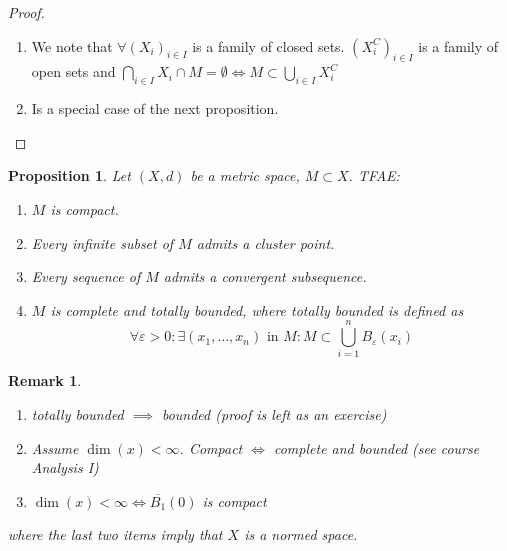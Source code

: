\documentclass[a4paper]{article}
\newcounter{lecref}[section]
\numberwithin{lecref}{section}
\newtheorem*{Remark}{Remark}
\newtheorem{proposition}[lecref]{Proposition}
\begin{document}
\begin{proof}
	\begin{enumerate}
		\item We note that $\forall (X_i)_{i \in I}$ is a family of closed sets.
			$(X_i^C)_{i \in I}$ is a family of open sets and $\bigcap_{i \in I} X_i \cap M = \emptyset \iff M \subset \bigcup_{i \in I} X_i^C$
		\item Is a special case of the next proposition.
	\end{enumerate}
\end{proof}

\begin{proposition}
	\label{proposition:1.19}
	Let $(X, d)$ be a metric space, $M \subset X$. TFAE:
	\begin{enumerate}
		\item $M$ is compact.
		\item Every infinite subset of $M$ admits a cluster point.
		\item Every sequence of $M$ admits a convergent subsequence.
		\item $M$ is complete and totally bounded, where totally bounded is defined as
			\[ \forall \varepsilon > 0: \exists (x_1, \dots, x_n) \text{ in } M: M \subset \bigcup_{i=1}^n B_\varepsilon(x_i) \]
	\end{enumerate}
\end{proposition}

\begin{Remark}
	\begin{enumerate}
		\item totally bounded $\implies$ bounded (proof is left as an exercise)
		\item Assume $\dim(x) < \infty$. Compact $\iff$ complete and bounded (see course Analysis I)
		\item $\dim(x) < \infty \iff \overline{B_1}(0)$ is compact
	\end{enumerate}
	where the last two items imply that $X$ is a normed space.
\end{Remark}
\end{document}

